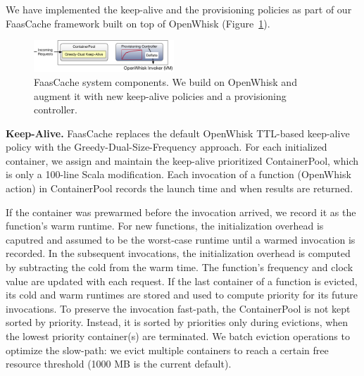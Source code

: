
We have implemented the keep-alive and the provisioning policies as part of our FaasCache framework built on top of OpenWhisk (Figure~\ref{fig:sys}). 

\begin{figure}[t]
  \centering
  \includegraphics[width=0.47\textwidth]{../figures/faascache.pdf}
  \caption{FaasCache system components. We build on OpenWhisk and augment it with new keep-alive policies and a provisioning controller. }
  \label{fig:sys}
  \vspace*{\myfigspace}
\end{figure}

\noindent \textbf{Keep-Alive.}
FaasCache replaces the default OpenWhisk TTL-based keep-alive policy with the Greedy-Dual-Size-Frequency approach. 
For each initialized container, we assign and maintain the keep-alive prioritized ContainerPool, which is only a 100-line Scala modification. 
Each invocation of a function (OpenWhisk action) in ContainerPool records the launch time and when results are returned.


If the container was prewarmed before the invocation arrived, we record it as the function's warm runtime.
For new functions, the initialization overhead is caputred and assumed to be the worst-case runtime until a warmed invocation is recorded. %
In the subsequent invocations, the initialization overhead is computed by subtracting the cold from the warm time. 
The function's frequency and clock value are updated with each request.
If the last container of a function is evicted, its cold and warm runtimes are stored and used to compute priority for its future invocations. 
%
To preserve the invocation fast-path, the ContainerPool is not kept sorted by priority. 
Instead, it is sorted by priorities only during evictions, when the lowest priority container(s) are terminated.
%
We batch eviction operations to optimize the slow-path: we evict multiple containers to reach a certain free resource threshold (1000 MB is the current default). 

